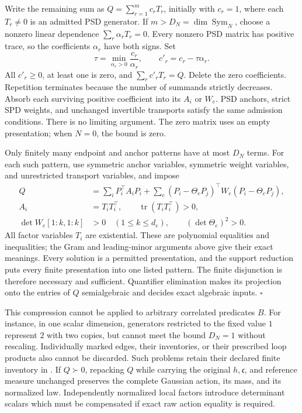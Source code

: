 Write the remaining sum as \(Q=\sum_{r=1}^m c_rT_r\), initially
with \(c_r=1\), where each \(T_r\ne0\) is an admitted PSD
generator. If \(m>D_N=\dim\operatorname{Sym}_N\), choose a
nonzero linear dependence \(\sum_r\alpha_rT_r=0\).
Every nonzero PSD matrix has positive trace, so the coefficients
\(\alpha_r\) have both signs. Set
\begin{equation}
\tau=\min_{\alpha_r>0}\frac{c_r}{\alpha_r},
\qquad c'_r=c_r-\tau\alpha_r.
\label{eq:cg-finite-pair-support-reduction}
\end{equation}
All \(c'_r\geq0\), at least one is zero, and
\(\sum_r c'_rT_r=Q\). Delete the zero coefficients. Repetition
terminates because the number of summands strictly decreases.
Absorb each surviving positive coefficient into its \(A_i\)
or \(W_e\). PSD anchors, strict SPD weights, and unchanged
invertible transports satisfy the same admission conditions.
There is no limiting argument. The zero matrix uses an empty
presentation; when \(N=0\), the bound is zero.

Only finitely many endpoint and anchor patterns have at most
\(D_N\) terms. For each such pattern, use symmetric anchor
variables, symmetric weight variables, and unrestricted
transport variables, and impose
\begin{equation}
\begin{aligned}
Q&=\sum_iP_i^\top A_iP_i+\sum_e
(P_i-\Theta_eP_j)^\top W_e(P_i-\Theta_eP_j),\\
A_i&=T_iT_i^\top,\qquad
\operatorname{tr}(T_iT_i^\top)>0,\\
\det W_e[1:k,1:k]&>0\quad(1\leq k\leq d_e),
\qquad(\det\Theta_e)^2>0.
\end{aligned}
\label{eq:cg-finite-pair-polynomial-system}
\end{equation}
All factor variables \(T_i\) are existential. These are
polynomial equalities and inequalities; the Gram and
leading-minor arguments above give their exact meanings.
Every solution is a permitted presentation, and the support
reduction puts every finite presentation into one listed
pattern. The finite disjunction is therefore necessary and
sufficient. Quantifier elimination makes its projection onto
the entries of \(Q\) semialgebraic and decides exact algebraic
inputs. \(\square\)

This compression cannot be applied to arbitrary correlated
predicates \(B\). For instance, in one scalar dimension,
generators restricted to the fixed value \(1\) represent \(2\)
with two copies, but cannot meet the bound \(D_N=1\) without
rescaling. Individually marked edges, their inventories, or
their prescribed loop products also cannot be discarded.
Such problems retain their declared finite inventory in
.
If \(Q\succ0\), repacking \(Q\) while carrying the original
\(h,\mathfrak c\), and reference measure unchanged preserves
the complete Gaussian action, its mass, and its normalized
law. Independently normalized local factors introduce
determinant scalars which must be compensated if exact raw
action equality is required.

